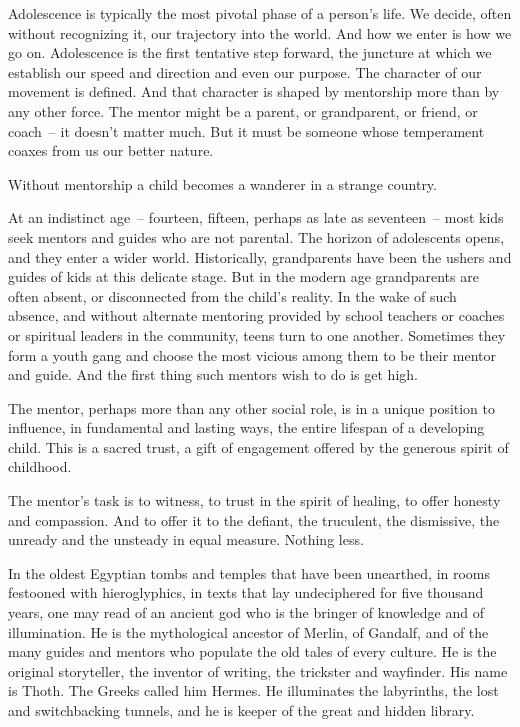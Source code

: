 \documentclass[12pt,DIV9,oneside,headsepline,footsepline]{scrreprt}
\begin{document}
Adolescence is typically the most pivotal phase of a person's life. We
decide, often without recognizing it, our trajectory into the world.
And how we enter is how we go on. Adolescence is the first tentative
step forward, the juncture at which we establish our speed and
direction and even our purpose. The character of our movement is
defined. And that character is shaped by mentorship more than by any
other force. The mentor might be a parent, or grandparent, or friend,
or coach~-- it doesn't matter much. But it must be someone whose
temperament coaxes from us our better nature.

Without mentorship a child becomes a wanderer in a strange country.

At an indistinct age~-- fourteen, fifteen, perhaps as late as
seventeen~-- most kids seek mentors and guides who are not parental.
The horizon of adolescents opens, and they enter a wider world.
Historically, grandparents have been the ushers and guides of kids at
this delicate stage. But in the modern age grandparents are often
absent, or disconnected from the child's reality. In the wake of such
absence, and without alternate mentoring provided by school teachers
or coaches or spiritual leaders in the community, teens turn to one
another. Sometimes they form a youth gang and choose the most vicious
among them to be their mentor and guide. And the first thing such
mentors wish to do is get high.

The mentor, perhaps more than any other social role, is in a unique
position to influence, in fundamental and lasting ways, the entire
lifespan of a developing child. This is a sacred trust, a gift of
engagement offered by the generous spirit of childhood.

The mentor's task is to witness, to trust in the spirit of healing, to
offer honesty and compassion. And to offer it to the defiant, the
truculent, the dismissive, the unready and the unsteady in equal
measure. Nothing less.

In the oldest Egyptian tombs and temples that have been unearthed, in
rooms festooned with hieroglyphics, in texts that lay undeciphered for
five thousand years, one may read of an ancient god who is the bringer
of knowledge and of illumination. He is the mythological ancestor of
Merlin, of Gandalf, and of the many guides and mentors who populate
the old tales of every culture. He is the original storyteller, the
inventor of writing, the trickster and wayfinder. His name is Thoth.
The Greeks called him Hermes. He illuminates the labyrinths, the lost
and switchbacking tunnels, and he is keeper of the great and hidden
library.
\end{document}
